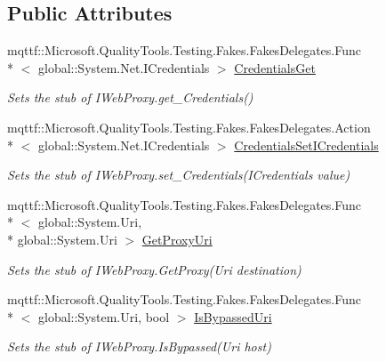 \subsection*{Public Attributes}
\begin{DoxyCompactItemize}
\item 
mqttf\-::\-Microsoft.\-Quality\-Tools.\-Testing.\-Fakes.\-Fakes\-Delegates.\-Func\\*
$<$ global\-::\-System.\-Net.\-I\-Credentials $>$ \hyperlink{class_system_1_1_net_1_1_fakes_1_1_stub_i_web_proxy_a46aa1c5231317c5fba149974427842fa}{Credentials\-Get}
\begin{DoxyCompactList}\small\item\em Sets the stub of I\-Web\-Proxy.\-get\-\_\-\-Credentials()\end{DoxyCompactList}\item 
mqttf\-::\-Microsoft.\-Quality\-Tools.\-Testing.\-Fakes.\-Fakes\-Delegates.\-Action\\*
$<$ global\-::\-System.\-Net.\-I\-Credentials $>$ \hyperlink{class_system_1_1_net_1_1_fakes_1_1_stub_i_web_proxy_a160403ddf45655183b4b5dc099711d73}{Credentials\-Set\-I\-Credentials}
\begin{DoxyCompactList}\small\item\em Sets the stub of I\-Web\-Proxy.\-set\-\_\-\-Credentials(\-I\-Credentials value)\end{DoxyCompactList}\item 
mqttf\-::\-Microsoft.\-Quality\-Tools.\-Testing.\-Fakes.\-Fakes\-Delegates.\-Func\\*
$<$ global\-::\-System.\-Uri, \\*
global\-::\-System.\-Uri $>$ \hyperlink{class_system_1_1_net_1_1_fakes_1_1_stub_i_web_proxy_a51d2ca19e1bcce1fa092d6a005df2246}{Get\-Proxy\-Uri}
\begin{DoxyCompactList}\small\item\em Sets the stub of I\-Web\-Proxy.\-Get\-Proxy(\-Uri destination)\end{DoxyCompactList}\item 
mqttf\-::\-Microsoft.\-Quality\-Tools.\-Testing.\-Fakes.\-Fakes\-Delegates.\-Func\\*
$<$ global\-::\-System.\-Uri, bool $>$ \hyperlink{class_system_1_1_net_1_1_fakes_1_1_stub_i_web_proxy_a990275edcb71023413082e7d2325baf3}{Is\-Bypassed\-Uri}
\begin{DoxyCompactList}\small\item\em Sets the stub of I\-Web\-Proxy.\-Is\-Bypassed(\-Uri host)\end{DoxyCompactList}\end{DoxyCompactItemize}



